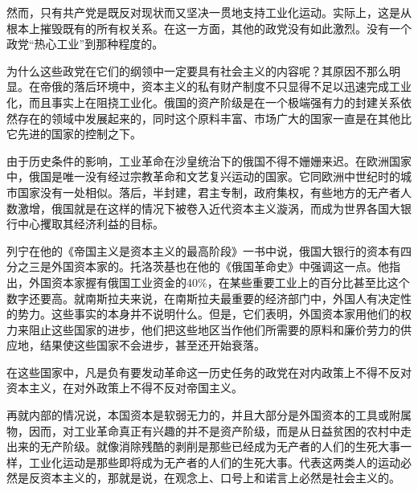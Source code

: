 \documentclass[12pt,oneside]{book}
\begin{document}
\begin{common-format}
然而，只有共产党是既反对现状而又坚决一贯地支持工业化运动。实际上，这是从根本上摧毁既有的所有权关系。在这一方面，其他的政党没有如此激烈。没有一个政党“热心工业”到那种程度的。

为什么这些政党在它们的纲领中一定要具有社会主义的内容呢？其原因不那么明显。在帝俄的落后环境中，资本主义的私有财产制度不只显得不足以迅速完成工业化，而且事实上在阻挠工业化。俄国的资产阶级是在一个极端强有力的封建关系依然存在的领域中发展起来的，同时这个原料丰富、市场广大的国家一直是在其他比它先进的国家的控制之下。

由于历史条件的影响，工业革命在沙皇统治下的俄国不得不姗姗来迟。在欧洲国家中，俄国是唯一没有经过宗教革命和文艺复兴运动的国家。它同欧洲中世纪时的城市国家没有一处相似。落后，半封建，君主专制，政府集权，有些地方的无产者人数激增，俄国就是在这样的情况下被卷入近代资本主义漩涡，而成为世界各国大银行中心攫取其经济利益的目标。

列宁在他的《帝国主义是资本主义的最高阶段》一书中说，俄国大银行的资本有四分之三是外国资本家的。托洛茨基也在他的《俄国革命史》中强调这一点。他指出，外国资本家握有俄国工业资金的40\%{}，在某些重要工业上的百分比甚至比这个数字还要高。就南斯拉夫来说，在南斯拉夫最重要的经济部门中，外国人有决定性的势力。这些事实的本身并不说明什么。但是，它们表明，外国资本家用他们的权力来阻止这些国家的进步，他们把这些地区当作他们所需要的原料和廉价劳力的供应地，结果使这些国家不会进步，甚至还开始衰落。

在这些国家中，凡是负有要发动革命这一历史任务的政党在对内政策上不得不反对资本主义，在对外政策上不得不反对帝国主义。

再就内部的情况说，本国资本是软弱无力的，并且大部分是外国资本的工具或附属物，因而，对工业革命真正有兴趣的并不是资产阶级，而是从日益贫困的农村中走出来的无产阶级。就像消除残酷的剥削是那些已经成为无产者的人们的生死大事一样，工业化运动是那些即将成为无产者的人们的生死大事。代表这两类人的运动必然是反资本主义的，那就是说，在观念上、口号上和诺言上必然是社会主义的。



\end{common-format}
\end{document}
